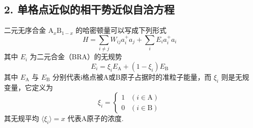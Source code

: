 \subsection*{2. 单格点近似的相干势近似自洽方程}

二元无序合金 $\mathrm{A}_{x}\mathrm{B}_{1-x}$ 的哈密顿量可以写成下列形式
\begin{equation}
  H=\sum_{i\neq j}W_{ij}a_{i}^{+}a_{j}+\sum_{i}E_{i}a_{i}^{+}a_{i}
\end{equation}
其中 $E_{i}$ 为二元合金（BRA）的无规势
\begin{equation}
  E_{i}=\xi_{i}E_{\mathrm{A}}+\left(1-\xi_{i}\right)E_{\mathrm{B}}
\end{equation}
其中 $E_{\mathrm{A}}$ 与 $E_{\mathrm{B}}$ 分别代表i格点被A或B原子占据时的准粒子能量，而 $\xi_{i}$ 则是无规变量，它定义为
\begin{equation}
  \xi_{i}=\begin{cases}1 & \left(i\in\mathrm{A}\right)\\ 0 & \left(i\in\mathrm{B}\right)\end{cases}
\end{equation}
其无规平均 $\langle\xi_{i}\rangle=x$ 代表A原子的浓度.

